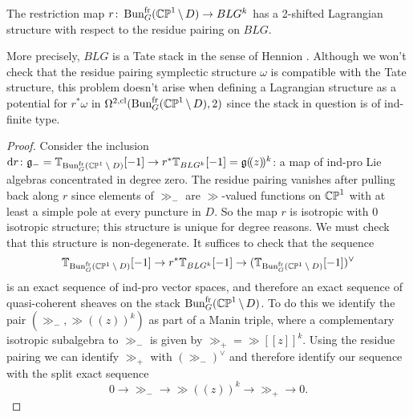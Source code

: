 \documentclass[10pt, oneside]{article}
\renewcommand{\d}{\mathrm{d}}
\newcommand{\fr}{\mathrm{fr}}
\begin{document}
\begin{lemma} \label{restriction_Lagn_lemma}
The restriction map $r \colon \bun_G^\fr(\bb{CP}^1 \! \bs \! D) \to BLG^k$ has a 2-shifted Lagrangian structure with respect to the residue pairing on $BLG$.
\end{lemma}

\begin{remark}
More precisely, $BLG$ is a Tate stack in the sense of Hennion \cite{Hennion}.  Although we won't check that the residue pairing symplectic structure $\omega$ is compatible with the Tate structure, this problem doesn't arise when defining a Lagrangian structure as a potential for $r^*\omega$ in $\Omega^{2,\mr{cl}}(\bun_G^\fr(\bb{CP}^1 \! \bs \! D), 2)$ since the stack in question is of ind-finite type.
\end{remark}

\begin{proof}
Consider the inclusion $\d r \colon \gg_- = \bb T_{\bun_G^\fr(\bb{CP}^1 \! \bs \! D)}[-1] \to r^*\bb T_{BLG^k}[-1] = \gg(\!(z)\!)^k$: a map of ind-pro Lie algebras concentrated in degree zero.  The residue pairing vanishes after pulling back along $r$ since elements of $\gg_-$ are  $\gg$-valued functions on $\mathbb{CP}^1$ with at least a simple pole at every puncture in $D$.  So the map $r$ is isotropic with 0 isotropic structure; this structure is unique for degree reasons.  We must check that this structure is non-degenerate.  It suffices to check that the sequence
\[\bb T_{\bun_G^\fr(\bb{CP}^1 \! \bs \! D)}[-1] \to r^*\bb T_{BLG^k}[-1] \to (\bb T_{\bun_G^\fr(\bb{CP}^1 \! \bs \! D)}[-1])^\vee\]
is an exact sequence of ind-pro vector spaces, and therefore an exact sequence of quasi-coherent sheaves on the stack $\bun_G^\fr(\bb{CP}^1 \! \bs \! D)$.  To do this we identify the pair $(\gg_-, \gg(\!(z)\!)^k)$ as part of a Manin triple, where a complementary isotropic subalgebra to $\gg_-$ is given by $\gg_+ = \gg[[z]]^k$.  Using the residue pairing we can identify $\gg_+$ with $(\gg_-)^\vee$ and therefore identify our sequence with the split exact sequence
\[0 \to \gg_- \to \gg(\!(z)\!)^k \to \gg_+ \to 0.\]
\end{proof}
\end{document}
